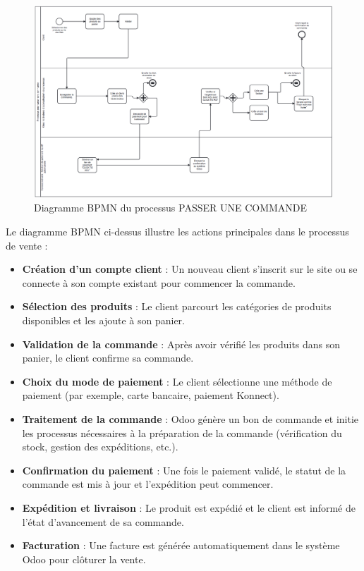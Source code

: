 \documentclass[12pt]{report}
\begin{document}
\begin{figure}[H]
    \centering
    \includegraphics[width=0.6\textheight]{images/BPMN.PNG}
    \caption{Diagramme BPMN du processus PASSER UNE COMMANDE}
    \label{fig:bpmn}
\end{figure}

Le diagramme BPMN ci-dessus illustre les actions principales dans le processus de vente :

\begin{itemize}
    \item \textbf{Création d'un compte client} : Un nouveau client s'inscrit sur le site ou se connecte à son compte existant pour commencer la commande.
    \item \textbf{Sélection des produits} : Le client parcourt les catégories de produits disponibles et les ajoute à son panier.
    \item \textbf{Validation de la commande} : Après avoir vérifié les produits dans son panier, le client confirme sa commande.
    \item \textbf{Choix du mode de paiement} : Le client sélectionne une méthode de paiement (par exemple, carte bancaire, paiement Konnect).
    \item \textbf{Traitement de la commande} : Odoo génère un bon de commande et initie les processus nécessaires à la préparation de la commande (vérification du stock, gestion des expéditions, etc.).
    \item \textbf{Confirmation du paiement} : Une fois le paiement validé, le statut de la commande est mis à jour et l’expédition peut commencer.
    \item \textbf{Expédition et livraison} : Le produit est expédié et le client est informé de l'état d'avancement de sa commande.
    \item \textbf{Facturation} : Une facture est générée automatiquement dans le système Odoo pour clôturer la vente.
\end{itemize}
\end{document}
